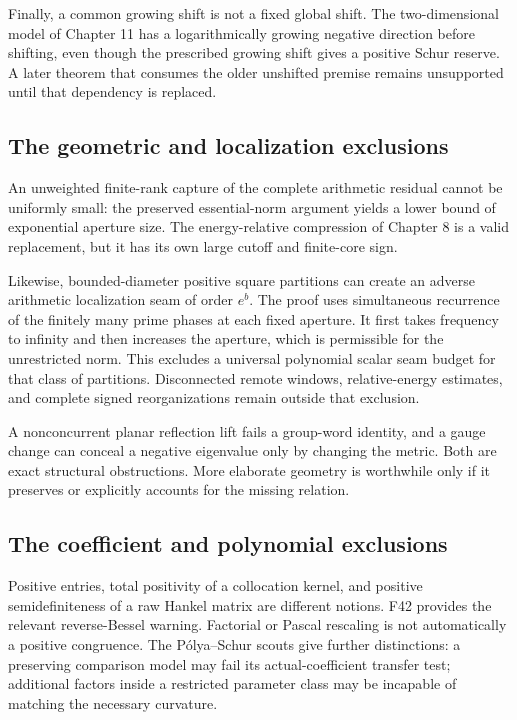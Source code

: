\documentclass[
  10pt,
  a4paper,
  10pt,
  oneside,
  openany]{book}
\begin{document}
Finally, a common growing shift is not a fixed global shift. The
two-dimensional model of Chapter 11 has a logarithmically growing
negative direction before shifting, even though the prescribed growing
shift gives a positive Schur reserve. A later theorem that consumes the
older unshifted premise remains unsupported until that dependency is
replaced.

\subsection{The geometric and localization
exclusions}\label{the-geometric-and-localization-exclusions}

An unweighted finite-rank capture of the complete arithmetic residual
cannot be uniformly small: the preserved essential-norm argument yields
a lower bound of exponential aperture size. The energy-relative
compression of Chapter 8 is a valid replacement, but it has its own
large cutoff and finite-core sign.

Likewise, bounded-diameter positive square partitions can create an
adverse arithmetic localization seam of order \(e^b\). The proof uses
simultaneous recurrence of the finitely many prime phases at each fixed
aperture. It first takes frequency to infinity and then increases the
aperture, which is permissible for the unrestricted norm. This excludes
a universal polynomial scalar seam budget for that class of partitions.
Disconnected remote windows, relative-energy estimates, and complete
signed reorganizations remain outside that exclusion.

A nonconcurrent planar reflection lift fails a group-word identity, and
a gauge change can conceal a negative eigenvalue only by changing the
metric. Both are exact structural obstructions. More elaborate geometry
is worthwhile only if it preserves or explicitly accounts for the
missing relation.

\subsection{The coefficient and polynomial
exclusions}\label{the-coefficient-and-polynomial-exclusions}

Positive entries, total positivity of a collocation kernel, and positive
semidefiniteness of a raw Hankel matrix are different notions. F42
provides the relevant reverse-Bessel warning. Factorial or Pascal
rescaling is not automatically a positive congruence. The Pólya--Schur
scouts give further distinctions: a preserving comparison model may fail
its actual-coefficient transfer test; additional factors inside a
restricted parameter class may be incapable of matching the necessary
curvature.
\end{document}
